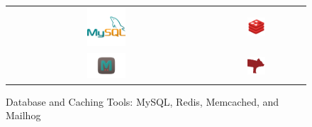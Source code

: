 \begin{figure}[H]
    \centering
    \begin{tabular}{cc}
        \includegraphics[width=0.2\textwidth]{images/mysql-logo.png} &
        \includegraphics[width=0.2\textwidth]{images/redis-logo.png} \\
        \includegraphics[width=0.2\textwidth]{images/memcached-Logo.png} &
        \includegraphics[width=0.2\textwidth]{images/mailhog-logo.png}
    \end{tabular}
    \caption{Database and Caching Tools: MySQL, Redis, Memcached, and Mailhog}
\end{figure}